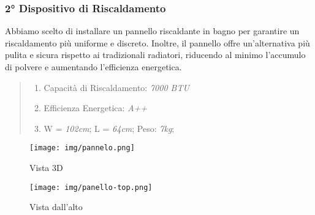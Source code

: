 \documentclass[italian, 12pt, a4paper]{article}
\begin{document}
\subsubsection{2° Dispositivo di Riscaldamento}
Abbiamo scelto di installare un pannello riscaldante in bagno per garantire un riscaldamento più uniforme e discreto. Inoltre, il pannello offre un'alternativa più pulita e sicura rispetto ai tradizionali radiatori, riducendo al minimo l'accumulo di polvere e aumentando l'efficienza energetica.
\begin{quote}
    \begin{enumerate}
        \item Capacità di Riscaldamento: \emph{7000 BTU}
        \item Efficienza Energetica: \emph{A++}
        \item W = \emph{102cm}; L = \emph{64cm}; Peso: \emph{7kg}; 
    \end{enumerate}
\end{quote}
\vspace{-15px}
\begin{figure}[h]
    \centering
    \begin{minipage}{0.45\textwidth}
        \centering
        \texttt{[image: img/pannelo.png]}
        \caption{Vista 3D}
    \end{minipage} \hfill
    \begin{minipage}{0.45\textwidth}
        \centering
        \texttt{[image: img/panello-top.png]}
        \caption{Vista dall'alto}
    \end{minipage}
\end{figure}
\clearpage

\clearpage
\end{document}
